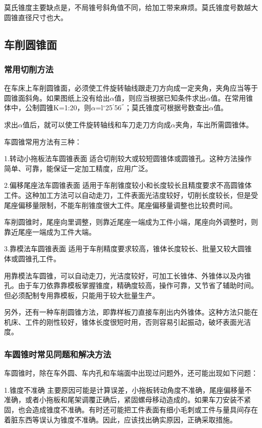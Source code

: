 \documentclass{ctexbook}
\begin{document}
莫氏锥度主要缺点是，不局锥号斜角值不同，给加工带来麻烦。莫氏锥度号数越大圆锥直径尺寸也大。
\subsection{车削圆锥面}
\subsubsection{常用切削方法}
在车床上车削圆锥面，必须使工件旋转轴线跟走刀方向成一定夹角，夹角应当等于圆锥面斜角。如果图纸上没有给出$\alpha$值，则应当根据已知条件求出$\alpha$值。在常用锥体中，公制圆锥K=1:20，则$\alpha$=l$^{\circ}$25$^{'}$56$^{''}$；莫氏锥度可根据号数查出$\alpha$值。

求出$\alpha$值后，就可以使工件旋转轴线和车刀走刀方向成$\alpha$夹角，车出所需圆锥体。

车圆锥常用方法有三种：

1.转动小拖板法车圆锥表面 适合切削较大或较短圆锥体或圆锥孔。这种方法操作简单、可靠，能保证一定加工精度，应用广泛。

2.偏移尾座法车圆锥表面 适用于车削锥度较小和长度较长且精度要求不高圆锥体工件。这种加工方法可以自动走刀，工件表面光洁度较好，切削长度较长，但是受尾座偏移量限制，不能车削锥度很大工件。尾座偏移量调整也比较费时间。

车削圆锥时，尾座向里调整，则靠近尾座一端成为工件小端，尾座向外调整时，则靠近尾座一端成为工件大端。

3.靠模法车圆锥表面 适用于车削精度要求较高，锥体长度较长、批量又较大圆锥体或圆锥孔工件。

用靠模法车圆锥，可以自动走刀，光洁度较好，可加工长锥体、外锥体以及内锥孔。由于车刀依靠靠模板掌握锥度，精确度较高，操作可靠，又节省了辅助时间。但必须配制专用靠模板，只能用于较大批量生产。

另外，还有一种车削圆锥方法，即靠样板刀直接车削出内外锥体。这种方法只能在机床、工件的刚性较好，锥体长度很短时用，否则容易引起振动，破坏表面光洁度。
\subsubsection{车圆锥时常见同题和解决方法}
车圆锥时，除在车外圆、车内孔和车端面中出现过问题外，还可能出现如下问题：

1.锥度不准确 主要原因可能是计算误差，小拖板转动角度不准确，尾座偏移量不准确，或者小拖板和尾架调覆正确后，紧固螺母移动造成的。如果车刀安装不紧固，也会造成锥度不准确。有时还可能把工件表面有细小毛刺或工件与量具间存在着脏东西等误认为锥度不准确。因此，应该找出确实原因，正确采取措施。
\end{document}
